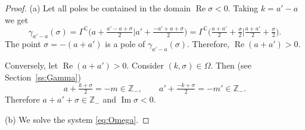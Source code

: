 \documentclass[pdftex]{sigma}
\numberwithin{equation}{section}
\renewcommand{\Re}{\mathop {\mathrm {Re}}\nolimits}
\renewcommand{\Re}{\mathop {\mathrm {Re}}\nolimits}
\renewcommand{\Im}{\mathop {\mathrm {Im}}\nolimits}
\def\C {{\mathbb C }}
\def\Z{{\mathbb Z}}
\begin{document}
\begin{proof} (a)
Let all poles be contained in the domain $\Re\sigma<0$.
Taking $k=a'-a$ we get
\[
\gamma_{a'-a}(\sigma)=\Gamma^\C
\big(a+\tfrac {a'-a+\sigma}2\big|a'+\tfrac {-a'+a+\sigma}2\big)=
\Gamma^\C\big(\tfrac{a+a'}2 +\tfrac{\sigma}{2}\big|\tfrac{a+a'}2
+\tfrac{\sigma}{2}\big).
\]
The point $\sigma= -(a+a')$ is a pole of $\gamma_{a'-a}(\sigma)$.
Therefore, $\Re(a+a')>0$.

Conversely, let $\Re(a+a')>0$.
Consider $(k,\sigma)\in \Omega$.
Then (see Section~\ref{ss:Gamma})
\begin{equation}
a+\tfrac{k+\sigma}2=-m\in \Z_-, \qquad a'+\tfrac{-k+\sigma}2=-m'\in \Z_-.
\label{eq:Omega}
\end{equation}
Therefore $a+a'+\sigma\in \Z_-$ and $\Im\sigma<0$.

(b) We solve the system \eqref{eq:Omega}.
\end{proof}
\end{document}
